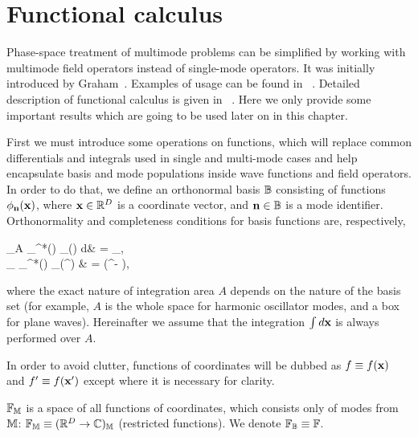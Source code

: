 \chapter{Functional calculus}

Phase-space treatment of multimode problems can be simplified by working with multimode field operators instead of single-mode operators.
It was initially introduced by Graham~\cite{Graham1970,Graham1970a}.
Examples of usage can be found in ~\cite{Steel1998,Norrie2006a}.
Detailed description of functional calculus is given in~\cite{Dalton2011} .
Here we only provide some important results which are going to be used later on in this chapter.

First we must introduce some operations on functions, which will replace common differentials and integrals used in single and multi-mode cases and help encapsulate basis and mode populations inside wave functions and field operators.
In order to do that, we define an orthonormal basis $\mathbb{B}$ consisting of functions $\phi_{\mathbf{n}}(\mathbf{x})$, where $\mathbf{x} \in \mathbb{R}^D$ is a coordinate vector, and $\mathbf{n} \in \mathbb{B}$ is a mode identifier.
Orthonormality and completeness conditions for basis functions are, respectively,
\begin{eqns}
	\int\limits_A \phi_{\nvec}^*(\xvec) \phi_{\mvec}(\xvec) d\xvec & = \delta_{\nvec\mvec}, \\
	\sum_{\nvec} \phi_{\nvec}^*(\xvec) \phi_{\nvec}(\xvec^\prime) & = \delta(\xvec^\prime - \xvec),
\end{eqns}
where the exact nature of integration area $A$ depends on the nature of the basis set
(for example, $A$ is the whole space for harmonic oscillator modes, and a box for plane waves).
Hereinafter we assume that the integration $\int d\mathbf{x}$ is always performed over $A$.

In order to avoid clutter, functions of coordinates will be dubbed as $f \equiv f(\mathbf{x})$ and $f^\prime \equiv f(\mathbf{x}^\prime)$ except where it is necessary for clarity.

\begin{definition}
	$\mathbb{F}_{\mathbb{M}}$ is a space of all functions of coordinates, which consists only of modes from $\mathbb{M}$: $\mathbb{F}_{\mathbb{M}} \equiv (\mathbb{R}^D \rightarrow \mathbb{C})_{\mathbb{M}}$ (restricted functions).
	We denote $\mathbb{F}_{\mathbb{B}} \equiv \mathbb{F}$.
\end{definition}

